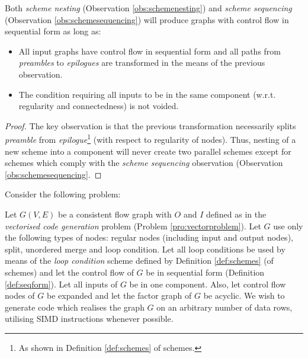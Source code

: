       Both \emph{scheme nesting} (Observation \ref{obs:schemenesting}) and \emph{scheme sequencing} (Observation \ref{obs:schemesequencing}) will produce graphs with control flow in sequential form as long as:
  \begin{itemize}
    \item All input graphs have control flow in sequential form and all paths from \emph{preambles} to \emph{epilogues} are transformed in the means of the previous observation.
    \item The condition requiring all inputs to be in the same component (w.r.t. regularity and connectedness) is not voided.
  \end {itemize} 
  \begin{proof} 
    The key observation is that the previous transformation necessarily splits \emph{preamble} from \emph{epilogue}\footnote{As shown in Definition \ref{def:schemes} of schemes.} (with respect to regularity of nodes). Thus, nesting of a new scheme into a component will never create two parallel schemes except for schemes which comply with the \emph{scheme sequencing} observation (Observation \ref{obs:schemesequencing}.
  \end{proof}
\myendobs


Consider the following problem:

      Let $G(V,E)$ be a consistent flow graph with $O$ and $I$ defined as in the \emph{vectorised code generation} problem (Problem \ref{pro:vectorproblem}). Let $G$ use only the following types of nodes: regular nodes (including input and output nodes), split, unordered merge and loop condition. Let all loop conditions be used by means of the \emph{loop condition} scheme defined by Definition \ref{def:schemes} (of schemes) and let the control flow of $G$ be in sequential form (Definition \ref{def:seqform}). Let all inputs of $G$ be in one component. Also, let control flow nodes of $G$ be expanded and let the factor graph of $G$ be acyclic. We wish to generate code which realises the graph $G$ on an arbitrary number of data rows, utilising SIMD instructions whenever possible. 
\myendprob

